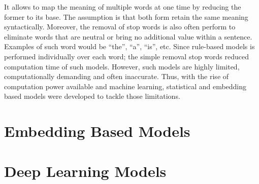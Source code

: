 It allows to map the meaning of multiple words at one time by reducing the former to its base. The assumption is that both form retain the same meaning syntactically. Moreover, the removal of stop words is also often perform to eliminate words that are neutral or bring no additional value within a sentence. Examples of such word would be “the”, “a”, “is”, etc. Since rule-based models is performed individually over each word; the simple removal stop words reduced computation time of such models. However, such models are highly limited, computationally demanding and often inaccurate. Thus, with the rise of computation power available and machine learning, statistical and embedding based models were developed to tackle those limitations.
\section{Embedding Based Models}

\section{Deep Learning Models}

